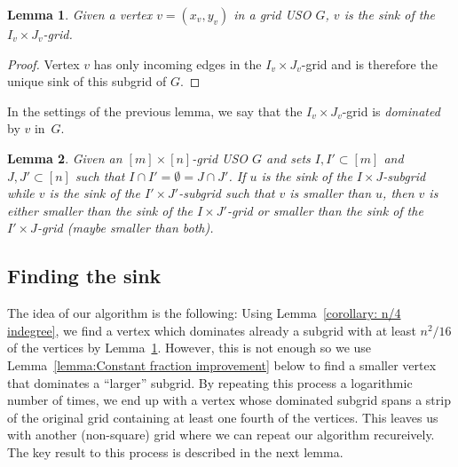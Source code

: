 \documentclass[a4paper,10pt]{article}
\newtheorem{lemma}{Lemma}
\begin{document}
\begin{lemma}\label{lemma:Sink of dominated grid}
Given a vertex  $v = (x_v, y_v)$ in a grid USO $G$, $v$ is the sink of the $I_v\times J_v$-grid.
\end{lemma}
\begin{proof}
Vertex $v$ has only incoming edges in the $I_v\times J_v$-grid and is therefore the unique sink of this subgrid of $G$. 
\end{proof}

In the settings of the previous lemma, we say that the $I_v\times J_v$-grid is \emph{dominated} by $v$ in~$G$.

\begin{lemma}
Given an $[m]\times[n]$-grid USO $G$ and sets $I, I'\subset [m]$ and $J,J'\subset [n]$ such that $I\cap I' = \emptyset = J\cap J'$. If $u$ is the sink of the $I\times J$-subgrid while $v$ is the sink of the $I'\times J'$-subgrid such that $v$ is smaller than $u$, then $v$ is either smaller than the sink of the $I\times J'$-grid or smaller than the sink of the $I'\times J$-grid (maybe smaller than both).
\end{lemma}


\subsection{Finding the sink}
The idea of our algorithm is the following: Using Lemma~\ref{corollary: n/4 indegree}, we find a vertex which dominates already a subgrid with at least $n^2/16$ of the vertices  by Lemma~\ref{lemma:Sink of dominated grid}. However, this is not enough so we use Lemma~\ref{lemma:Constant fraction improvement} below to find a smaller vertex that dominates a ``larger'' subgrid. By repeating this process a logarithmic number of times, we end up with a vertex whose dominated subgrid spans a strip of the original grid containing at least one fourth of the vertices. This leaves us with another (non-square) grid where we can repeat our algorithm recureively. The key result to this process is described in the next lemma.
\end{document}
